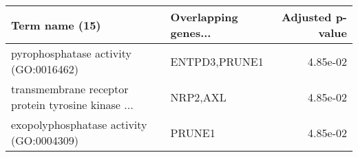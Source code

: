 \begin{tabular}{llr}
\toprule
                                    Term name (15) & Overlapping genes... &  Adjusted p-value \\
\midrule
             pyrophosphatase activity (GO:0016462) &        ENTPD3,PRUNE1 &          4.85e-02 \\
transmembrane receptor protein tyrosine kinase ... &             NRP2,AXL &          4.85e-02 \\
          exopolyphosphatase activity (GO:0004309) &               PRUNE1 &          4.85e-02 \\
\bottomrule
\end{tabular}
